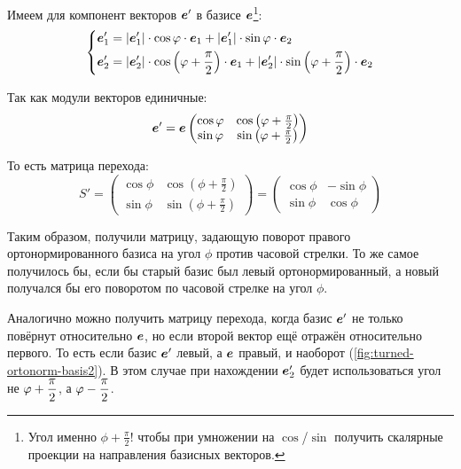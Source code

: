 \documentclass[a4paper,12pt]{article}
\begin{document}
  Имеем для компонент векторов $\boldsymbol e'$ в базисе $\boldsymbol e$\footnote{Угол именно $\phi + \frac{\pi}{2}$! чтобы при умножении на $\cos$/$\sin$ получить скалярные проекции на направления базисных векторов.}:
  \[
    \left\{
      \begin{aligned}
        &\boldsymbol e_1' = |\boldsymbol e_1'| \cdot \cos\varphi \cdot \boldsymbol e_1 + |\boldsymbol e_1'| \cdot \sin\varphi \cdot \boldsymbol e_2\\
        &\boldsymbol e_2' = |\boldsymbol e_2'| \cdot \cos{\left(\varphi+ \frac{\pi}{2}\right)} \cdot \boldsymbol e_1 + |\boldsymbol e_2'| \cdot \sin{\left(\varphi+ \frac{\pi}{2}\right)} \cdot \boldsymbol e_2
      \end{aligned}
    \right.
  \]
  
  Так как модули векторов единичные:
  \[
    \boldsymbol e' = \boldsymbol e \begin{pmatrix}
      \cos\varphi & \cos{\left(\varphi+ \frac{\pi}{2}\right)}\\
      \sin\varphi & \sin{\left(\varphi+ \frac{\pi}{2}\right)}
    \end{pmatrix}
  \]
  
  То есть матрица перехода:
  \[
    S' = \begin{pmatrix}
      \cos\phi & \cos{\left(\phi + \frac{\pi}{2}\right)}\\
      \sin\phi & \sin{\left(\phi + \frac{\pi}{2}\right)}
    \end{pmatrix}
    = \begin{pmatrix}
      \cos\phi & -\sin\phi\\
      \sin\phi & \cos\phi
    \end{pmatrix}
  \]
  
  Таким образом, получили матрицу, задающую поворот правого ортонормированного базиса на угол $\phi$ против часовой стрелки.
  То же самое получилось бы, если бы старый базис был левый ортонормированный, а новый получался бы его поворотом по часовой стрелке на угол $\phi$.
  
  Аналогично можно получить матрицу перехода, когда базис $\boldsymbol e'$ не только повёрнут относительно $\boldsymbol e$, но если второй вектор ещё отражён относительно первого.
  То есть если базис $\boldsymbol e'$ левый, а $\boldsymbol e$ правый, и наоборот (\ref{fig:turned-ortonorm-basis2}).
  В этом случае при нахождении $\boldsymbol e_2'$ будет использоваться угол не $\phi \hm+ \dfrac{\pi}{2}$, а $\phi \hm- \dfrac{\pi}{2}$.
  
\end{document}

